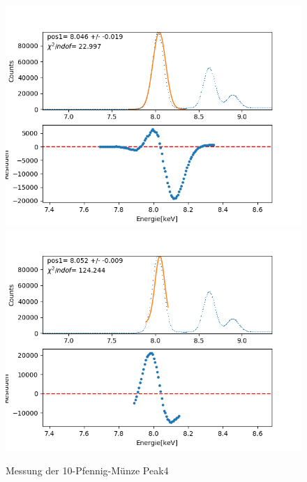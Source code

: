 \documentclass[12pt,a4paper]{article}
\begin{document}
\begin{figure}[H]
\centering
\includegraphics[scale=0.49]{Bilder/roentgen_spektren/pfennig/pfen4_1.png}
\includegraphics[scale=0.49]{Bilder/roentgen_spektren/pfennig/pfen4_2.png}
\caption{Messung der 10-Pfennig-Münze Peak4}
\end{figure}
\end{document}
